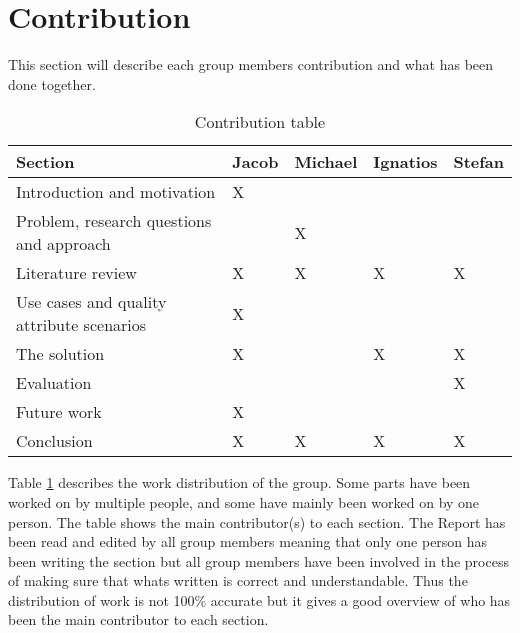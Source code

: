 \documentclass[conference]{IEEEtran}
\begin{document}
\maketitle
\IEEEpubidadjcol


\section{Contribution}
This section will describe each group members contribution and what has been done together.
\begin{table}[h]
    \begin{tabular}{|l|l|l|l|l|}
        \hline
        \textbf{Section}                          & Jacob & Michael & Ignatios & Stefan \\
        \hline
        Introduction and motivation               & X     &         &          &        \\
        \hline
        Problem, research questions and approach  &       & X       &          &        \\
        \hline
        Literature review                         & X     & X       & X        & X      \\
        \hline
        Use cases and quality attribute scenarios & X     &         &          &        \\
        \hline
        The solution                              & X     &         & X        & X      \\
        \hline
        Evaluation                                &       &         &          & X      \\
        \hline
        Future work                               & X     &         &          &        \\
        \hline
        Conclusion                                & X     & X       & X        & X      \\
        \hline
    \end{tabular}
    \caption{Contribution table}
    \label{tab:contribution-table}
\end{table}

Table \ref{tab:contribution-table} describes the work distribution of the group. Some parts have been worked on by multiple people, and some have mainly been worked on by one person. The table shows the main contributor(s) to each section. The Report has been read and edited by all group members meaning that only one person has been writing the section but all group members have been involved in the process of making sure that whats written is correct and understandable. Thus the distribution of work is not 100\% accurate but it gives a good overview of who has been the main contributor to each section.
\end{document}
